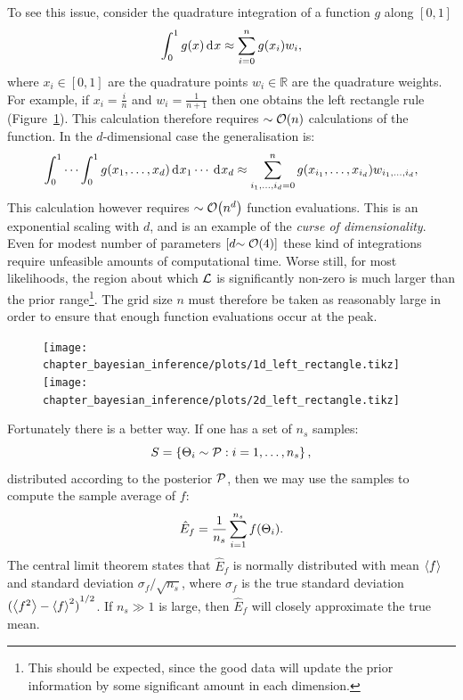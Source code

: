 To see this issue, consider the quadrature integration of a function $g$ along $[0,1]$
\begin{equation}
  \int_0^1 g(x) \operatorname{d}^{}\!{x} \approx \sum\limits_{i=0}^{n} g(x_i) w_i,
  \label{eqn:bay:quadrature_1d}
\end{equation}
where ${x_i\in[0,1]}$ are the quadrature points ${w_i\in\mathbb{R}}$ are the quadrature weights. For example, if $x_i = \frac{i}{n}$ and $w_i=\frac{1}{n+1}$ then one obtains the left rectangle rule (Figure~\ref{fig:bay:quadrature}). This calculation therefore requires ${\sim\mathcal{O}{\left(n\right)}}$ calculations of the function. In the $d$-dimensional case the generalisation is:
\begin{equation}
  \int_0^1\cdots\int_0^1 g(x_1,\ldots,x_d) \operatorname{d}^{}\!{x_1}\cdots \: \operatorname{d}^{}\!{x_d} \approx \sum\limits_{i_1,\ldots,i_d=0}^{n} g(x_{i_1},\ldots,x_{i_d}) w_{i_1,\ldots,i_d},
  \label{eqn:bay:quadrature_nd}
\end{equation}
This calculation however requires ${\sim\mathcal{O}{\left(n^d\right)}}$ function evaluations. This is an exponential scaling with $d$, and is an example of the {\em curse of dimensionality}. Even for modest number of parameters $\left[ d{\sim\mathcal{O}{\left(4\right)}} \right]$ these kind of integrations require unfeasible amounts of computational time. Worse still, for most likelihoods, the region about which $\mathcal{L}$ is significantly non-zero is much larger than the prior range\footnote{This should be expected, since the good data will update the prior information by some significant amount in each dimension.}. The grid size $n$ must therefore be taken as reasonably large in order to ensure that enough function evaluations occur at the peak.

\begin{figure}[tbp]
  \centering
  \ifdefined\lightweight{}
  \else
    \texttt{[image: chapter\_bayesian\_inference/plots/1d\_left\_rectangle.tikz]}
    \texttt{[image: chapter\_bayesian\_inference/plots/2d\_left\_rectangle.tikz]}
  \fi
  \caption{\label{fig:bay:quadrature}}
\end{figure}

Fortunately there is a better way. If one has a set of $n_s$ samples:
\begin{equation}
  S = \left\{ \Theta_i\sim\mathcal{P}:i=1,\ldots,n_s \right\},
  \label{eqn:bay:samples}
\end{equation}
distributed according to the posterior $\mathcal{P}$, then we may use the samples to compute the sample average of $f$:
\begin{equation}
  \hat{E}_f = \frac{1}{n_s}\sum\limits_{i=1}^{n_s} f(\Theta_i).
  \label{eqn:bay:ehat}
\end{equation}
The central limit theorem states that $\hat{E}_f$ is normally distributed with mean ${\left\langle{f}\right\rangle}$ and standard deviation $\sigma_f/\sqrt{n_s}$, where $\sigma_f$ is the true standard deviation ${({\left\langle{f^2}\right\rangle}-{\left\langle{f}\right\rangle}^2)}^{1/2}$. If $n_s\gg 1$ is large, then $\hat{E}_f$ will closely approximate the true mean. 

